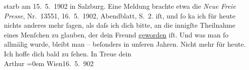 \begin{ledgroupsized}[t]{13cm}
{{{                   starb am
                     15. 5. 1902 in Salzburg. Eine Meldung brachte etwa die \emph{Neue Freie Presse}, Nr. 13551,
                        16. 5. 1902, Abendblatt, S. 2.}}}\label{K_L01220_1h}
               iſt, und ſo ka{\geminationn} ich für heute nichts anderes mehr ſagen,
               als daſs ich dich bitte, an die innigſte {\pb}Theilnahme eines
               Menſchen zu glauben, der dein Freund \uline{geworden} iſt.
               Und was man ſo allmälig wurde, bleibt man – beſonders in unſeren Jahren. Nicht mehr
               für heute. Ich hoffe dich bald zu ſehen.\pend
           \pstart
           In Treue dein{\\[\baselineskip]}\spacefill\mbox{Arthur}\pend
           \leftskip=0em{}\pstart
           Wien16. 5. 902\pend
           
         
         \endnumbering{}\end{ledgroupsized}  \newcommand{\dateiname}{L01220}\newcommand{\titel}{Arthur Schnitzler an Hermann Bahr, 16. 5. 1902}\newcommand{\editorInnen}{ Kurt Ifkovits,  Martin Anton Müller}
      